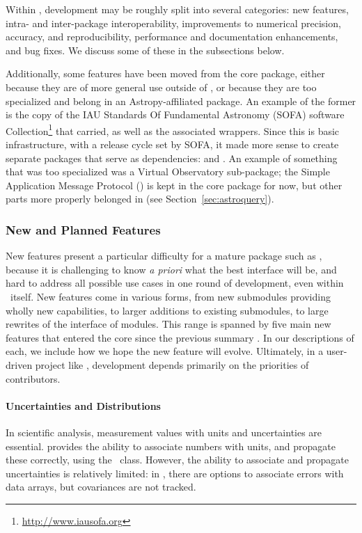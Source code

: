\documentclass[modern]{aastex631}
\begin{document}
Within \astropypkg, development may be roughly split into several
categories: new features, intra- and inter-package interoperability,
improvements to numerical precision, accuracy, and reproducibility, performance
and documentation enhancements, and bug fixes. We discuss some of these in the subsections below.

Additionally, some features have been moved from the core package, either
because they are of more general use outside of \astropypkg, or because they are
too specialized and belong in an Astropy-affiliated package. An example of the
former is the copy of the IAU Standards Of Fundamental Astronomy (SOFA) software
Collection\footnote{\url{http://www.iausofa.org}} \citep{sofa} that \astropy
carried, as well as the associated \python wrappers. Since this is basic
infrastructure, with a release cycle set by SOFA, it made more sense to create
separate packages that serve as \astropypkg dependencies: 
\citep{erfa} and  \citep{pyerfa}. An example of something that
was too specialized was a Virtual Observatory sub-package; the Simple
Application Message Protocol () is kept in the core package
for now, but other parts more properly belonged in
 (see Section~\ref{sec:astroquery}).


\subsubsection{New and Planned Features} \label{sec:core-features-new}

New features present a particular difficulty for a mature package such as
\astropypkg, because it is challenging to know {\em a priori} what the best
interface will be, and hard to address all possible use cases in one round of
development, even within \astropypkg\ itself. New features come in various forms,
from new submodules providing wholly new capabilities, to larger additions to
existing submodules, to large rewrites of the interface of modules. This range
is spanned by five main new features that entered the \astropypkg core since the
previous summary . In our descriptions of each, we
include how we hope the new feature will evolve. Ultimately, in a user-driven
project like \astropy, development depends primarily on the priorities of
contributors.

\paragraph{Uncertainties and Distributions} In scientific analysis,
measurement values with units and uncertainties are essential.
\astropyunits provides the ability to associate numbers with units, and
propagate these correctly, using the \astropyQuantity\ class. However, the
ability to associate and propagate uncertainties is relatively limited: in
, there are options to associate errors with data arrays,
but covariances are not tracked.
\end{document}
